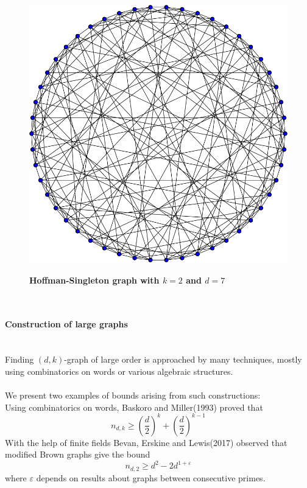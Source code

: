 \documentclass[portrait,a0,final]{a0poster}
\begin{document}
\begin{multicols}{3}
\begin{figure}
	\centering
	\includegraphics[scale=0.7]{Hoffman-Singleton_graph.png}

	\textbf{Hoffman-Singleton graph with $k=2$ and $d=7$}
\end{figure}

~\\
\paragraph{Construction of large graphs}
~\\
Finding $(d,k)$-graph of large order is approached by many techniques, mostly using combinatorics on words or various algebraic structures. \\~\\
We present two examples of bounds arising from such constructions: ~\\
Using combinatorics on words, Baskoro and Miller(1993) \cite{Bas-Mil} proved that 
\begin{equation*}
	n_{d,k} \geq \left( \frac{d}{2} \right)^{k} +  \left( \frac{d}{2} \right)^{k-1}     
\end{equation*}
With the help of finite fields Bevan, Erskine and Lewis(2017) \cite{Bev-Ers} observed that modified Brown graphs give the bound
\begin{equation*}
	n_{d,2} \geq d^{2} - 2d^{1+\varepsilon}     
\end{equation*}
where $\varepsilon$ depends on results about graphs between consecutive primes. 


\end{multicols}
\end{document}
